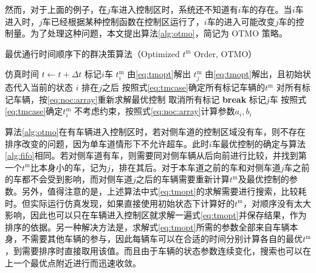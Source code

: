 然而，对于上面的例子，在$j$车进入控制区时，系统还不知道有$i$车的存在。当$i$车进入时，$j$车已经根据某种控制函数在控制区运行了，$i$车的进入可能改变$j$车的控制量。为了处理这种问题，本文提出算法\eqref{alg:otmo}，简记为 OTMO 策略。
\begin{algorithm}
\caption{最优通行时间顺序下的群决策算法（Optimized $t^\mathrm{m}$ Order, OTMO）}
\label{alg:otmo}
\begin{algorithmic}
  \Statex
    \State 仿真时间 $t\gets t+\Delta t$
          \State 标记$i$车
            \State $t_i^\mathrm{m}$ 由\eqref{eq:tmopt}解出
            \State $t_j^\mathrm{m}$ 由\eqref{eq:tmopt}解出，且初始状态代入当前的状态
              \State $i$ 排在$j$之后
              \State 按照式\eqref{eq:tmcase}确定所有标记车辆的$t^\mathrm{m}$
              \State 对所有标记车辆，按\eqref{eq:noc:array}重新求解最优控制
              \State 取消所有标记
              \State \textbf{break}
            \EndIf
            \State 标记$j$车
          \EndFor
        \Else
          \State 按照式\eqref{eq:tmcase}确定$t_i^\mathrm{m}$
          \State 不考虑约束，按照式\eqref{eq:noc:array}计算参数$a_i, b_i$
        \EndIf
      \EndFor
    \EndIf
  \EndWhile
\end{algorithmic}
\end{algorithm}

\begin{remark}
算法\eqref{alg:otmo}在有车辆进入控制区时，若对侧车道的控制区域没有车，则不存在排序改变的问题，因为单车道情形下不允许超车。此时$i$车最优控制的确定与算法\eqref{alg:fifo}相同。若对侧车道有车，则需要同对侧车辆从后向前进行比较，并找到第一个$t^\mathrm{m}$比本身小的车，记为$j$，排在其后。对于本车道之前的车和对侧车道$j$车之前的车都不会受到影响，而对侧车道$j$之后的车辆需要重新计算$t^\mathrm{m}$及最优控制的参数。另外，值得注意的是，上述算法中式\eqref{eq:tmopt}的求解需要进行搜索，比较耗时。但实际运行仿真发现，如果直接使用初始状态下计算好的$t^\mathrm{m}$，对顺序没有太大影响，因此也可以只在车辆进入控制区就求解一遍式\eqref{eq:tmopt}并保存结果，作为排序的依据。另一种解决方法是，求解式\eqref{eq:tmopt}所需的参数全部来自车辆本身，不需要其他车辆的参与，因此每辆车可以在合适的时间分别计算各自的最优$t^\mathrm{m}$，到需要排序时直接取用该值。而且由于车辆的状态参数连续变化，搜索也可以在上一个最优点附近进行而迅速收敛。
\end{remark}

